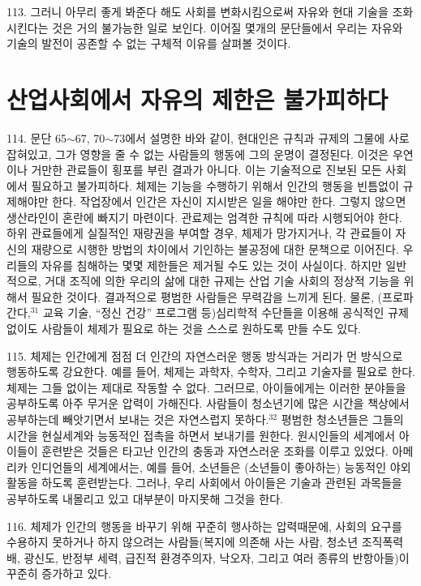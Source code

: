 \documentclass[11pt,a4paper]{article}
\begin{document}
\begin{multicols}{2}
113. 그러니 아무리 좋게 봐준다 해도 사회를 변화시킴으로써 자유와 현대 기술을 조화시킨다는 것은  거의 불가능한 일로 보인다. 이어질 몇개의 문단들에서 우리는 자유와 기술의 발전이 공존할 수 없는  구체적 이유를 살펴볼 것이다. 


\section*{산업사회에서 자유의 제한은 불가피하다}


114. 문단 65${\sim}$67, 70${\sim}$73에서 설명한 바와 같이, 현대인은 규칙과 규제의 그물에 사로잡혀있고, 그가 영향을 줄 수 없는 사람들의 행동에 그의 운명이 결정된다. 이것은 우연이나 거만한 관료들이 횡포를 부린 결과가 아니다. 이는 기술적으로 진보된 모든 사회에서 필요하고 불가피하다. 체제는 기능을 수행하기  위해서 인간의 행동을 빈틈없이 규제해야만 한다. 작업장에서 인간은 자신이 지시받은 일을 해야만 한다.  그렇지 않으면 생산라인이 혼란에 빠지기 마련이다. 관료제는 엄격한 규칙에 따라 시행되어야 한다. 하위  관료들에게 실질적인 재량권을 부여할 경우, 체제가 망가지거나, 각 관료들이 자신의 재량으로 시행한  방법의 차이에서 기인하는 불공정에 대한 문책으로 이어진다. 우리들의 자유를 침해하는 몇몇 제한들은 제거될 수도 있는 것이 사실이다. 하지만 일반적으로, 거대 조직에 의한 우리의 삶에 대한 규제는 산업 기술 사회의 정상적 기능을 위해서 필요한 것이다. 결과적으로 평범한 사람들은 무력감을 느끼게 된다.  물론, (프로파간다,\hyperlink{31}{$^{31}$} 교육 기술, “정신 건강” 프로그램 등)심리학적 수단들을 이용해 공식적인 규제  없이도 사람들이 체제가 필요로 하는 것을 스스로 원하도록 만들 수도 있다. 


115. 체제는 인간에게 점점 더 인간의 자연스러운 행동 방식과는 거리가 먼 방식으로 행동하도록  강요한다. 예를 들어, 체제는 과학자, 수학자, 그리고 기술자를 필요로 한다. 체제는 그들 없이는 제대로  작동할 수 없다. 그러므로, 아이들에게는 이러한 분야들을 공부하도록 아주 무거운 압력이 가해진다.  사람들이 청소년기에 많은 시간을 책상에서 공부하는데 빼앗기면서 보내는 것은 자연스럽지 못하다.\hyperlink{32}{$^{32}$} 평범한 청소년들은 그들의 시간을 현실세계와 능동적인 접촉을 하면서 보내기를 원한다. 원시인들의  세계에서 아이들이 훈련받은 것들은 타고난 인간의 충동과 자연스러운 조화를 이루고 있었다. 아메리카  인디언들의 세계에서는, 예를 들어, 소년들은 (소년들이 좋아하는) 능동적인 야외 활동을 하도록  훈련받는다. 그러나, 우리 사회에서 아이들은 기술과 관련된 과목들을 공부하도록 내몰리고 있고  대부분이 마지못해 그것을 한다.  


116. 체제가 인간의 행동을 바꾸기 위해 꾸준히 행사하는 압력때문에, 사회의 요구를 수용하지 못하거나  하지 않으려는 사람들(복지에 의존해 사는 사람, 청소년 조직폭력배, 광신도, 반정부 세력, 급진적  환경주의자, 낙오자, 그리고 여러 종류의 반항아들)이 꾸준히 증가하고 있다.  



\end{multicols}
\end{document}
